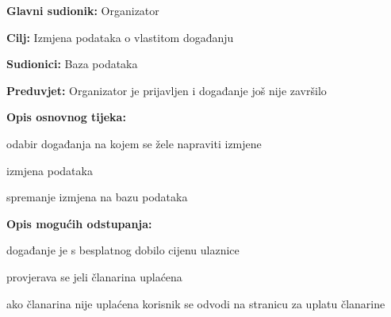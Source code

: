 					\noindent {}
					\begin{packed_item}
	
						\item \textbf{Glavni sudionik: }Organizator
						\item  \textbf{Cilj:} Izmjena podataka o vlastitom događanju
						\item  \textbf{Sudionici:} Baza podataka
						\item  \textbf{Preduvjet:} Organizator je prijavljen i događanje još nije završilo
						\item  \textbf{Opis osnovnog tijeka:}
						
						\item[] \begin{packed_enum}
	
							\item odabir događanja na kojem se žele napraviti izmjene
							\item izmjena podataka
							\item spremanje izmjena na bazu podataka
							
						\end{packed_enum}
						
						\item  \textbf{Opis mogućih odstupanja:}
						
						\item[] \begin{packed_item}
	
							\item[2.a] događanje je s besplatnog dobilo cijenu ulaznice
							\item[] \begin{packed_enum}
								
								\item provjerava se jeli članarina uplaćena
								\item ako članarina nije uplaćena korisnik se odvodi na stranicu za uplatu članarine
								
							\end{packed_enum}
						\end{packed_item}
							
					\end{packed_item}
					
